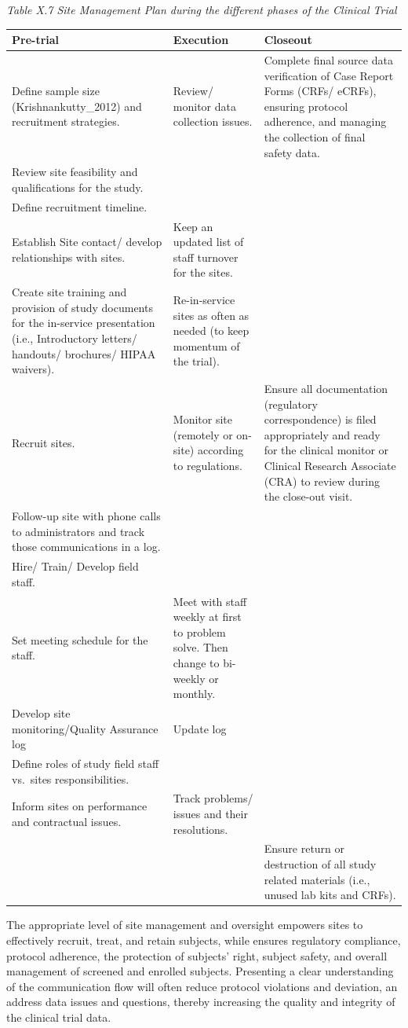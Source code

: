 \documentclass[]{book}
\begin{document}
\emph{Table X.7 Site Management Plan during the different phases of the
Clinical Trial}

\begin{longtable}[]{@{}lll@{}}
\toprule
Pre-trial & Execution & Closeout\tabularnewline
\midrule
\endhead
Define sample size (Krishnankutty\_2012) and recruitment strategies. &
Review/ monitor data collection issues. & Complete final source data
verification of Case Report Forms (CRFs/ eCRFs), ensuring protocol
adherence, and managing the collection of final safety
data.\tabularnewline
Review site feasibility and qualifications for the study. &
&\tabularnewline
Define recruitment timeline. & &\tabularnewline
Establish Site contact/ develop relationships with sites. & Keep an
updated list of staff turnover for the sites. &\tabularnewline
Create site training and provision of study documents for the in-service
presentation (i.e., Introductory letters/ handouts/ brochures/ HIPAA
waivers). & Re-in-service sites as often as needed (to keep momentum of
the trial). &\tabularnewline
Recruit sites. & Monitor site (remotely or on-site) according to
regulations. & Ensure all documentation (regulatory correspondence) is
filed appropriately and ready for the clinical monitor or Clinical
Research Associate (CRA) to review during the close-out
visit.\tabularnewline
Follow-up site with phone calls to administrators and track those
communications in a log. & &\tabularnewline
Hire/ Train/ Develop field staff. & &\tabularnewline
Set meeting schedule for the staff. & Meet with staff weekly at first to
problem solve. Then change to bi-weekly or monthly. &\tabularnewline
Develop site monitoring/Quality Assurance log & Update log
&\tabularnewline
Define roles of study field staff vs.~sites responsibilities. &
&\tabularnewline
Inform sites on performance and contractual issues. & Track problems/
issues and their resolutions. &\tabularnewline
& & Ensure return or destruction of all study related materials (i.e.,
unused lab kits and CRFs).\tabularnewline
\bottomrule
\end{longtable}

The appropriate level of site management and oversight empowers sites to
effectively recruit, treat, and retain subjects, while ensures
regulatory compliance, protocol adherence, the protection of subjects'
right, subject safety, and overall management of screened and enrolled
subjects. Presenting a clear understanding of the communication flow
will often reduce protocol violations and deviation, an address data
issues and questions, thereby increasing the quality and integrity of
the clinical trial data.
\end{document}
